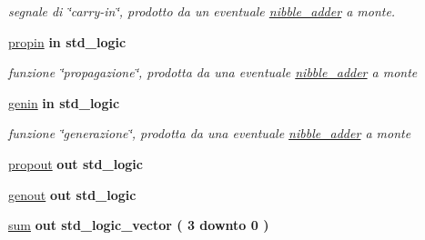 \begin{DoxyCompactItemize}
\begin{DoxyCompactList}\small\item\em segnale di \char`\"{}carry-\/in\char`\"{}, prodotto da un eventuale \hyperlink{classnibble__adder}{nibble\+\_\+adder} a monte. \end{DoxyCompactList}\item 
\hyperlink{group___nibble_adder_ga422e8e7ee01fc7ac7b7390cd2ad8c87b}{propin}  {\bfseries {\bfseries \textcolor{vhdlchar}{in}\textcolor{vhdlchar}{ }}} {\bfseries \textcolor{vhdlchar}{std\+\_\+logic}\textcolor{vhdlchar}{ }} 
\begin{DoxyCompactList}\small\item\em funzione \char`\"{}propagazione\char`\"{}, prodotta da una eventuale \hyperlink{classnibble__adder}{nibble\+\_\+adder} a monte \end{DoxyCompactList}\item 
\hyperlink{group___nibble_adder_ga0a46d5193cb73eb993bc5d4f69741d0a}{genin}  {\bfseries {\bfseries \textcolor{vhdlchar}{in}\textcolor{vhdlchar}{ }}} {\bfseries \textcolor{vhdlchar}{std\+\_\+logic}\textcolor{vhdlchar}{ }} 
\begin{DoxyCompactList}\small\item\em funzione \char`\"{}generazione\char`\"{}, prodotta da una eventuale \hyperlink{classnibble__adder}{nibble\+\_\+adder} a monte \end{DoxyCompactList}\item 
\hyperlink{group___nibble_adder_ga5957c9cdd706cafd2da8855133a002c9}{propout}  {\bfseries {\bfseries \textcolor{vhdlchar}{out}\textcolor{vhdlchar}{ }}} {\bfseries \textcolor{vhdlchar}{std\+\_\+logic}\textcolor{vhdlchar}{ }} 
\item 
\hyperlink{group___nibble_adder_ga068cd5c4d23e284cb942702252ed1491}{genout}  {\bfseries {\bfseries \textcolor{vhdlchar}{out}\textcolor{vhdlchar}{ }}} {\bfseries \textcolor{vhdlchar}{std\+\_\+logic}\textcolor{vhdlchar}{ }} 
\item 
\hyperlink{group___nibble_adder_gadfe538323c3296159dd3b383325a996b}{sum}  {\bfseries {\bfseries \textcolor{vhdlchar}{out}\textcolor{vhdlchar}{ }}} {\bfseries \textcolor{vhdlchar}{std\+\_\+logic\+\_\+vector}\textcolor{vhdlchar}{ }\textcolor{vhdlchar}{(}\textcolor{vhdlchar}{ }\textcolor{vhdlchar}{ } \textcolor{vhdldigit}{3} \textcolor{vhdlchar}{ }\textcolor{vhdlchar}{downto}\textcolor{vhdlchar}{ }\textcolor{vhdlchar}{ } \textcolor{vhdldigit}{0} \textcolor{vhdlchar}{ }\textcolor{vhdlchar}{)}\textcolor{vhdlchar}{ }} 
\end{DoxyCompactItemize}
